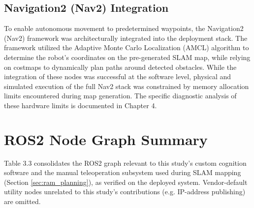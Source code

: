 \subsection{Navigation2 (Nav2) Integration}
To enable autonomous movement to predetermined waypoints, the Navigation2 (Nav2) framework \cite{macenski2020marathon2} was architecturally
integrated into the deployment stack. The framework utilized the Adaptive Monte Carlo Localization (AMCL) algorithm to determine the robot's coordinates on the pre-generated SLAM map, while relying on costmaps to dynamically plan paths around detected obstacles. While the integration of these nodes was successful at the software level, physical and simulated execution of the full Nav2 stack was constrained by memory allocation limits encountered during map generation. The specific diagnostic analysis of these hardware limits is documented in Chapter 4.

\section{ROS2 Node Graph Summary}

Table 3.3 consolidates the ROS2 graph relevant to this study's custom cognition software
and the manual teleoperation subsystem used during SLAM mapping (Section
\ref{sec:ram_planning}), as verified on the deployed system. Vendor-default utility nodes
unrelated to this study's contributions (e.g. IP-address publishing) are omitted.

\begin{table}[H]
\centering
\caption{Deployed ROS2 Nodes, Topics, and Services}
\label{tab:node_graph}
\end{table}

